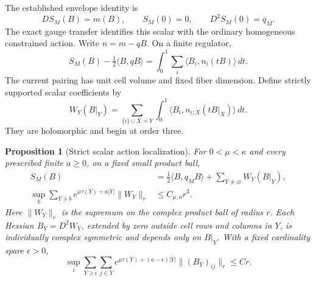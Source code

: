 \documentclass[11pt]{article}
\newtheorem{proposition}[theorem]{Proposition}
\theoremstyle{remark}\newtheorem{remark}[theorem]{Remark}
\begin{document}
The established envelope identity is
\begin{equation}
 DS_M(B)=m(B),\qquad S_M(0)=0,\qquad D^2S_M(0)=q_M.          \label{cl-envelope-input}
\end{equation}
The exact gauge transfer identifies this scalar with the ordinary
homogeneous constrained action. Write $n=m-qB$. On a finite regulator,
\begin{equation}
 S_M(B)-\tfrac12\langle B,qB\rangle
    =\int_0^1\sum_i\langle B_i,n_i(tB)\rangle\,dt.           \label{cl-envelope}
\end{equation}
The current pairing has unit cell volume and fixed fiber dimension.
Define strictly supported scalar coefficients by
\begin{equation}
 W_Y(B|_Y)=
 \sum_{\{i\}\cup X=Y}\int_0^1
       \langle B_i,n_{i;X}(tB|_X)\rangle\,dt.                \label{cl-action-coefficients}
\end{equation}
They are holomorphic and begin at order three.

\begin{proposition}[Strict scalar action localization]
\label{cl-action-theorem}
For $0<\mu<\kappa$ and every prescribed finite $a\ge0$, on a fixed
small product ball,
\begin{align}
 S_M(B)&=\tfrac12\langle B,q_MB\rangle+\sum_{Y\ne\varnothing}W_Y(B|_Y),
                                                               \label{cl-action-expansion}\\
 \sup_b\sum_{Y\ni b}e^{\mu\tau(Y)+a|Y|}\|W_Y\|_r
       &\le C_{\mu,a}r^3.                                    \label{cl-action-norm}
\end{align}
Here $\|W_Y\|_r$ is the supremum on the complex product ball of radius
$r$. Each Hessian $B_Y=D^2W_Y$, extended by zero outside cell rows and
columns in $Y$, is individually complex symmetric and depends only on
$B|_Y$. With a fixed cardinality spare $\epsilon>0$,
\begin{equation}
 \sup_i\sum_{Y\ni i}\sum_{j\in Y}
 e^{\mu\tau(Y)+(a-\epsilon)|Y|}
            \|(B_Y)_{ij}\|_r\le C r.                       \label{cl-hessian-support}
\end{equation}
\end{proposition}
\end{document}
